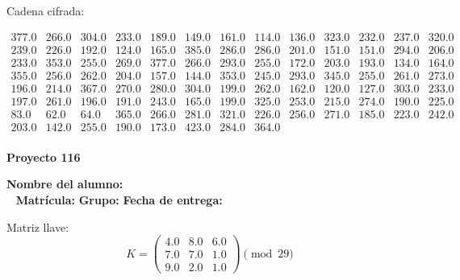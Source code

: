 \documentclass[12pt]{article}
\begin{document}
Cadena cifrada:
\begin{center}
$\begin{array}{lllllllllllll}
377.0 & 266.0 & 304.0 & 233.0 & 189.0 & 149.0 & 161.0 & 114.0 & 136.0 & 323.0 & 232.0 & 237.0 & 320.0\\
239.0 & 226.0 & 192.0 & 124.0 & 165.0 & 385.0 & 286.0 & 286.0 & 201.0 & 151.0 & 151.0 & 294.0 & 206.0\\
233.0 & 353.0 & 255.0 & 269.0 & 377.0 & 266.0 & 293.0 & 255.0 & 172.0 & 203.0 & 193.0 & 134.0 & 164.0\\
355.0 & 256.0 & 262.0 & 204.0 & 157.0 & 144.0 & 353.0 & 245.0 & 293.0 & 345.0 & 255.0 & 261.0 & 273.0\\
196.0 & 214.0 & 367.0 & 270.0 & 280.0 & 304.0 & 199.0 & 262.0 & 162.0 & 120.0 & 127.0 & 303.0 & 233.0\\
197.0 & 261.0 & 196.0 & 191.0 & 243.0 & 165.0 & 199.0 & 325.0 & 253.0 & 215.0 & 274.0 & 190.0 & 225.0\\
83.0 & 62.0 & 64.0 & 365.0 & 266.0 & 281.0 & 321.0 & 226.0 & 256.0 & 271.0 & 185.0 & 223.0 & 242.0\\
203.0 & 142.0 & 255.0 & 190.0 & 173.0 & 423.0 & 284.0 & 364.0\\
\end{array}$
\end{center}

\newpage


\textbf{Proyecto 116}

\textbf{Nombre del alumno:} \underline{\hspace{13cm}}\\\
\vspace{1cm}
\textbf{Matrícula:} \underline{\hspace{4cm}} \hspace{1cm}
\textbf{Grupo:} \underline{\hspace{2cm}}
\textbf{Fecha de entrega:} \underline{\hspace{2cm}}

\medskip

Matriz llave:
\[
K = \begin{pmatrix}
4.0 & 8.0 & 6.0\\
7.0 & 7.0 & 1.0\\
9.0 & 2.0 & 1.0
\end{pmatrix} \pmod{29}
\]
\end{document}
